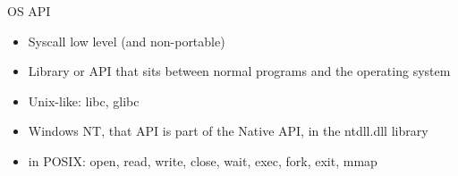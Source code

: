 \documentclass{beamer}
\begin{document}
\begin{frame}{OS API}
    \begin{itemize}
    \item Syscall low level (and non-portable)
    \item Library or API that sits between normal programs and the
      operating system 
    \item Unix-like: libc, glibc
    \item Windows NT, that API is part of the Native API, in the
      ntdll.dll library
    \item in POSIX: open, read, write, close, wait, exec, fork, exit, mmap
    \end{itemize}
\end{frame}
\end{document}
